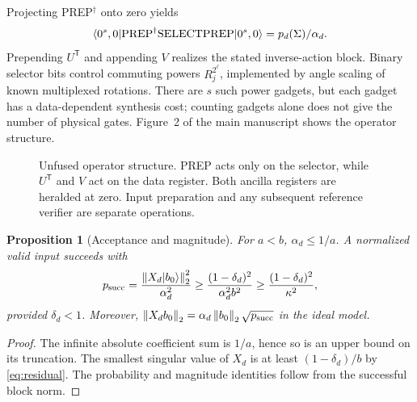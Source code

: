 \documentclass[10pt]{article}
\newtheorem{proposition}{Proposition}
\newcommand{\norm}[1]{\left\lVert #1\right\rVert}
\newcommand{\ket}[1]{\lvert #1\rangle}
\newcommand{\bra}[1]{\langle #1\rvert}
\newcommand{\tr}{\mathsf T}
\begin{document}
Projecting PREP$^{\dagger}$ onto zero yields
\begin{equation}\label{eq:lcu}
 \bra{0^s,0}{\rm PREP}^{\dagger}{\rm SELECT}{\rm PREP}\ket{0^s,0}
 =p_d(\Sigma)/\alpha_d.
\end{equation}
Prepending $U^{\tr}$ and appending $V$ realizes the stated inverse-action block. Binary selector bits control commuting powers $R_j^{2^\ell}$, implemented by angle scaling of known multiplexed rotations. There are $s$ such power gadgets, but each gadget has a data-dependent synthesis cost; counting gadgets alone does not give the number of physical gates. Figure~2 of the main manuscript shows the operator structure.

\begin{figure}[!tbp]\centering
{}
\caption{Unfused operator structure. PREP acts only on the selector, while $U^{\tr}$ and $V$ act on the data register. Both ancilla registers are heralded at zero. Input preparation and any subsequent reference verifier are separate operations.}
\label{fig:circuit}
\end{figure}

\begin{proposition}[Acceptance and magnitude]\label{prop:success}
For $a<b$, $\alpha_d\le1/a$. A normalized valid input succeeds with
\begin{equation}\label{eq:success}
 p_{\rm succ}=\frac{\norm{X_d\ket{b_0}}_2^2}{\alpha_d^2}
 \ge\frac{(1-\delta_d)^2}{\alpha_d^2 b^2}
 \ge\frac{(1-\delta_d)^2}{\kappa^2},
\end{equation}
provided $\delta_d<1$. Moreover, $\norm{X_db_0}_2=\alpha_d\norm{b_0}_2\sqrt{p_{\rm succ}}$ in the ideal model.
\end{proposition}
\begin{proof}
The infinite absolute coefficient sum is $1/a$, hence so is an upper bound on its truncation. The smallest singular value of $X_d$ is at least $(1-\delta_d)/b$ by \eqref{eq:residual}. The probability and magnitude identities follow from the successful block norm.
\end{proof}
\end{document}
